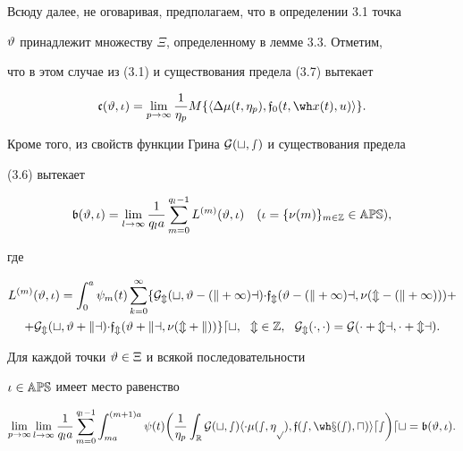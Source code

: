 Всюду далее, не оговаривая, предполагаем, что в определении 3.1 точка


$\vartheta$ принадлежит множеству $\Xi$, определенному в лемме 3.3. Отметим,


что в этом случае из (3.1) и существования предела (3.7) вытекает


$$


\frak c(\vt,\iota)=\lim_{p\to\infty}\frac{1}{\eta_{p}}


M\{\la\Dl\mu(t,\eta_{p}),\frak{f}_{0}(t,\wh x(t),u)\ra\}.


$$


Кроме того, из свойств функции Грина $\cal G(t,s)$ и существования предела


(3.6) вытекает


\begin{equation}


\frak b(\vt,\iota)=


\lim_{l\to\infty}\frac{1}{q_{l}a}\sum_{m=0}^{q_{l}-1}


L^{(m)}(\vt,\iota)\quad (\iota=\{\nu(m)\}_{m\in\Bbb Z}\in\Bbb{APS}),


\end{equation}


где


\begin{multline}


L^{(m)}(\vt,\iota)=\int_{0}^{a}\psi_{m}(t)\sum_{k=0}^{\infty}


\{\pG_{m}(t,\vt-(k+1)a)\Dl{\frak{f}}_{m}(\vt-(k+1)a,\nu(m-(k+1)))+ \\


+\pG_{m}(t,\vt+ka)\Dl{\frak{f}}_{m}(\vt+ka,\nu(m+k))\}dt,


\ \ m\in\Bbb Z, \ \ \pG_{m}(\cdot,\cdot)=\pG(\cdot+ma,\cdot+ma).


\end{multline}





\begin{lems}


Для каждой точки $\vartheta\in\Xi$ и всякой последовательности


$\iota\in\Bbb{APS}$ имеет место равенство


$$


\lim_{p\to\infty}\lim_{l\to\infty}\frac{1}{q_{l}a}


\sum_{m=0}^{q_l-1}\int_{ma}^{(m+1)a}\psi(t)\bigg(\frac{1}{\eta_{p}}


\int_{\R}\pG(t,s)\la\Dl\mu(s,\eta_{p}),


\frak{f}(s,\wh x(s),u)\ra ds\bigg)dt=\frak b(\vt,\iota).


$$


\end{lems}





